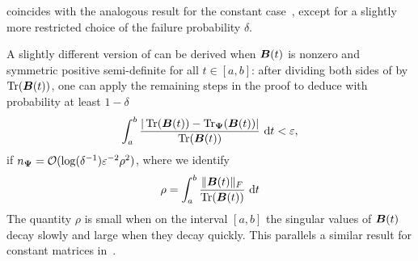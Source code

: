 %

 coincides with the analogous result for the constant case~\cite[Lemma 2.1]{meyer-2021-hutch-optimal}, except for a slightly more restricted choice of the failure probability $\delta$.

\begin{remark}
    A slightly different version of  can be derived when $\boldsymbol{B}(t)$ is nonzero and symmetric positive semi-definite for all $t \in [a, b]$: after dividing both sides of  by $\operatorname{Tr}(\boldsymbol{B}(t))$, one can apply the remaining steps in the proof to deduce with probability at least $1 - \delta$
    \begin{equation}
        \int_{a}^{b} \frac{| \operatorname{Tr}(\boldsymbol{B}(t)) - \operatorname{Tr}_{\boldsymbol{\Psi}}(\boldsymbol{B}(t)) |}{\operatorname{Tr}(\boldsymbol{B}(t))} ~\mathrm{d}t < \varepsilon,
    \end{equation}
    if $n_{\boldsymbol{\Psi}} = \mathcal{O}(\log(\delta^{-1}) \varepsilon^{-2} \rho^2)$, where we identify
    \begin{equation}
        \rho = \int_{a}^{b} \frac{\lVert \boldsymbol{B}(t) \rVert _F}{\operatorname{Tr}(\boldsymbol{B}(t))} ~\mathrm{d}t
    \end{equation}
    The quantity $\rho$ is small when on the interval $[a, b]$ the singular values of $\boldsymbol{B}(t)$ decay slowly and large when they decay quickly. This parallels a similar result for constant matrices in~\cite[Remark 2]{cortinovis-2022-randomized-trace}.
\end{remark}

